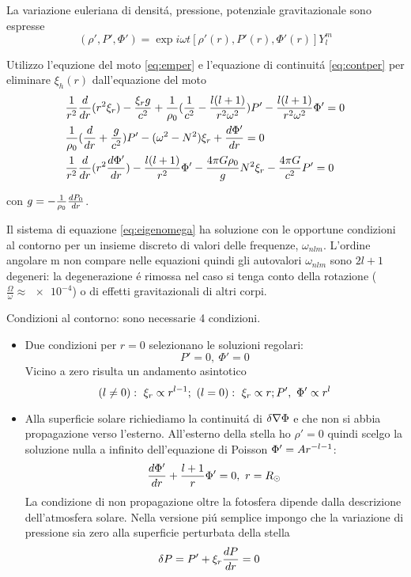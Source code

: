 \documentclass[../main.tex]{subfiles}
\begin{document}
La variazione euleriana di densit\'a, pressione, potenziale gravitazionale sono espresse
\begin{equation}
(\rho',P',\Phi')=\exp{i\omega t}[\rho'(r),P'(r),\Phi'(r)]Y_l^m
\end{equation}


Utilizzo l'equzione del moto \eqref{eq:emper} e l'equazione di continuit\'a \eqref{eq:contper} per eliminare $\xi_h(r)$ dall'equazione del moto
\begin{align}
&\frac{1}{r^2}\TDof{r}(r^2\xi_r)-\frac{\xi_rg}{c^2}+\frac{1}{\rho_0}(\frac{1}{c^2}-\frac{l(l+1)}{r^2\omega^2})P'-\frac{l(l+1)}{r^2\omega^2}\Phi'=0\nonumber\\
&\frac{1}{\rho_0}(\TDof{r}+\frac{g}{c^2})P'-(\omega^2-N^2)\xi_r+\TDy{r}{\Phi'}=0\label{eq:eigenomega}\\
&\frac{1}{r^2}\TDof{r}(r^2\TDy{r}{\Phi'})-\frac{l(l+1)}{r^2}\Phi'-\frac{4\pi G\rho_0}{g}N^2\xi_r-\frac{4\pi G}{c^2}P'=0\nonumber
\end{align}

con $g=-\frac{1}{\rho_0}\TDy{r}{P_0}$.

Il sistema di equazione \eqref{eq:eigenomega} ha soluzione con le opportune condizioni al contorno per un insieme discreto di valori delle frequenze, $\omega_{nlm}$. L'ordine angolare m non compare nelle equazioni quindi gli autovalori $\omega_{nlm}$ sono $2l+1$ degeneri: la degenerazione \'e rimossa nel caso si tenga conto della rotazione ($\frac{\Omega}{\omega}\approx\num{e-4}$) o di effetti gravitazionali di altri corpi.

Condizioni al contorno: sono necessarie 4 condizioni.
\begin{itemize}
\item Due condizioni per $r=0$ selezionano le soluzioni regolari:
\begin{equation}
P'=0,\ \Phi'=0
\end{equation}
Vicino a zero risulta un andamento asintotico
\begin{equation}
(l\neq0):\ \xi_r\propto r\expy{l-1};\ (l=0):\ \xi_r\propto r;P',\ \Phi'\propto r^l
\end{equation}

\item Alla superficie solare richiediamo la continuit\'a di $\Lvar{\nabla\Phi}$ e che non si abbia propagazione verso l'esterno.
All'esterno della stella ho $\rho'=0$ quindi scelgo la soluzione nulla a infinito dell'equazione di Poisson $\Phi'=Ar\expy{-l-1}$:
\begin{equation}
\TDy{r}{\Phi'}+\frac{l+1}{r}\Phi'=0,\ r=\rsun{}    
\end{equation}
La condizione di non propagazione oltre la fotosfera dipende dalla descrizione dell'atmosfera solare. Nella versione pi\'u semplice impongo che la variazione di pressione sia zero alla superficie perturbata della stella
\begin{align}
&\Lvar{P}=P'+\xi_r\TDy{r}{P}=0
\end{align}
\end{itemize}
\end{document}
